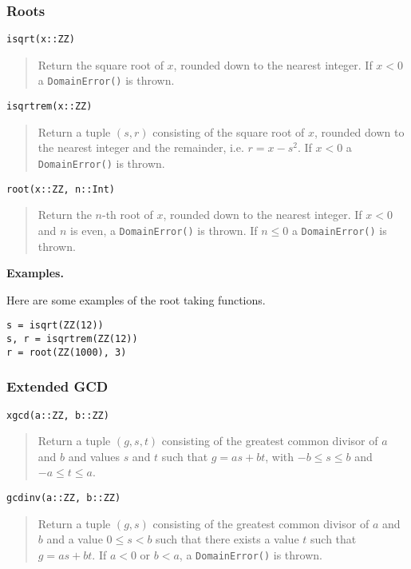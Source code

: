 \documentclass[a4paper,10pt]{article}
\newcommand{\code}{\lstinline}
\newcommand{\desc}[1]{\vspace{-3mm}\begin{quote}#1\end{quote}}
\begin{document}
{{{\subsubsection{Roots}

\begin{lstlisting}
isqrt(x::ZZ)
\end{lstlisting}

\desc{Return the square root of $x$, rounded down to the nearest integer. If $x < 0$
a \code{DomainError()} is thrown.}

\begin{lstlisting}
isqrtrem(x::ZZ)
\end{lstlisting}

\desc{Return a tuple $(s, r)$ consisting of the square root of $x$, rounded down to the 
nearest integer and the remainder, i.e. $r = x - s^2$. If $x < 0$ a \code{DomainError()}
is thrown.}

\begin{lstlisting}
root(x::ZZ, n::Int)
\end{lstlisting}

\desc{Return the $n$-th root of $x$, rounded down to the nearest integer. If $x < 0$ and
$n$ is even, a \code{DomainError()} is thrown. If $n \leq 0$ a \code{DomainError()} is
thrown.}

\textbf{Examples.}

Here are some examples of the root taking functions.

\begin{lstlisting}
s = isqrt(ZZ(12))
s, r = isqrtrem(ZZ(12))
r = root(ZZ(1000), 3)
\end{lstlisting}

\subsubsection{Extended GCD}

\begin{lstlisting}
xgcd(a::ZZ, b::ZZ)
\end{lstlisting}

\desc{Return a tuple $(g, s, t)$ consisting of the greatest common divisor of $a$ and $b$
and values $s$ and $t$ such that $g = as + bt$, with $-b \leq s \leq b$ and 
$-a \leq t \leq a$.}

\begin{lstlisting}
gcdinv(a::ZZ, b::ZZ)
\end{lstlisting}

\desc{Return a tuple $(g, s)$ consisting of the greatest common divisor of $a$ and $b$
and a value $0 \leq s < b$ such that there exists a value $t$ such that 
$g = as + bt$. If $a < 0$ or $b < a$, a \code{DomainError()} is thrown.}

}}}
\end{document}
